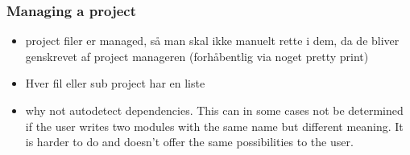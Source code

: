 \subsubsection{Managing a project}


\begin{itemize}
\item project filer er managed, så man skal ikke manuelt rette i dem, da de
  bliver genskrevet af project manageren (forhåbentlig via noget pretty print)

\item Hver fil eller sub project har en liste 

\item why not autodetect dependencies. This can in some cases not be determined
  if the user writes two modules with the same name but different meaning. It is
  harder to do and doesn't offer the same possibilities to the user.
\end{itemize}

